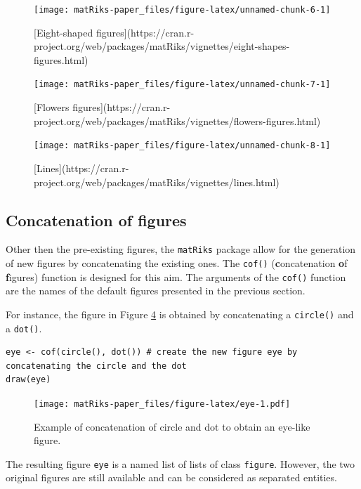 \begin{figure}
\texttt{[image: matRiks-paper\_files/figure-latex/unnamed-chunk-6-1]} \caption{[Eight-shaped figures](https://cran.r-project.org/web/packages/matRiks/vignettes/eight-shapes-figures.html)}\label{fig:unnamed-chunk-6}
\end{figure}

\begin{figure}
\texttt{[image: matRiks-paper\_files/figure-latex/unnamed-chunk-7-1]} \caption{[Flowers figures](https://cran.r-project.org/web/packages/matRiks/vignettes/flowers-figures.html)}\label{fig:unnamed-chunk-7}
\end{figure}

\begin{figure}
\texttt{[image: matRiks-paper\_files/figure-latex/unnamed-chunk-8-1]} \caption{[Lines](https://cran.r-project.org/web/packages/matRiks/vignettes/lines.html)}\label{fig:unnamed-chunk-8}
\end{figure}

\subsection{Concatenation of figures}\label{concatenation-of-figures}

Other then the pre-existing figures, the \texttt{matRiks} package allow for the generation of new figures by concatenating the existing ones. The \texttt{cof()} (\textbf{c}oncatenation \textbf{o}f \textbf{f}igures) function is designed for this aim. The arguments of the \texttt{cof()} function are the names of the default figures presented in the previous section.

For instance, the figure in Figure \ref{fig:eye} is obtained by concatenating a \texttt{circle()} and a \texttt{dot()}.

\begin{verbatim}
eye <- cof(circle(), dot()) # create the new figure eye by concatenating the circle and the dot
draw(eye)
\end{verbatim}

\begin{figure}
\centering
\texttt{[image: matRiks-paper\_files/figure-latex/eye-1.pdf]}
\caption{\label{fig:eye}Example of concatenation of circle and dot to obtain an eye-like figure.}
\end{figure}

The resulting figure \texttt{eye} is a named list of lists of class \texttt{figure}. However, the two original figures are still available and can be considered as separated entities.


